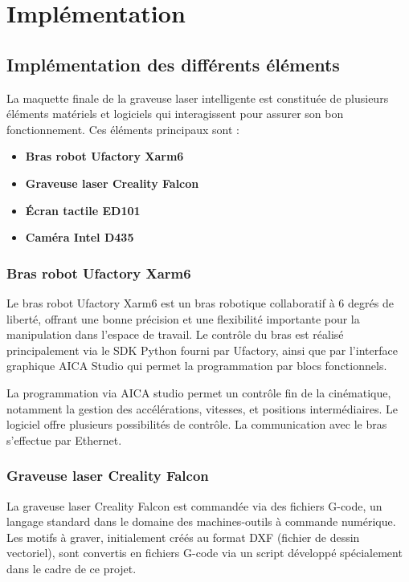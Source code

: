 \chapter{Implémentation}

\section{Implémentation des différents éléments}

La maquette finale de la graveuse laser intelligente est constituée de plusieurs éléments matériels et logiciels qui interagissent pour assurer son bon fonctionnement. Ces éléments principaux sont :

\begin{itemize}
    \item \textbf{Bras robot Ufactory Xarm6}
    \item \textbf{Graveuse laser Creality Falcon}
    \item \textbf{Écran tactile ED101}
    \item \textbf{Caméra Intel D435}
\end{itemize}

\subsection{Bras robot Ufactory Xarm6}

Le bras robot Ufactory Xarm6 est un bras robotique collaboratif à 6 degrés de liberté, offrant une bonne précision et une flexibilité importante pour la manipulation dans l’espace de travail. Le contrôle du bras est réalisé principalement via le SDK Python fourni par Ufactory, ainsi que par l’interface graphique AICA Studio qui permet la programmation par blocs fonctionnels.

La programmation via AICA studio permet un contrôle fin de la cinématique, notamment la gestion des accélérations, vitesses, et positions intermédiaires. Le logiciel offre plusieurs possibilités de contrôle. La communication avec le bras s’effectue par Ethernet.

\subsection{Graveuse laser Creality Falcon}

La graveuse laser Creality Falcon est commandée via des fichiers G-code, un langage standard dans le domaine des machines-outils à commande numérique. Les motifs à graver, initialement créés au format DXF (fichier de dessin vectoriel), sont convertis en fichiers G-code via un script développé spécialement dans le cadre de ce projet.

